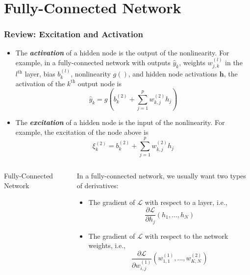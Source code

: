 \documentclass{beamer}
\begin{document}
\section[FCN]{Fully-Connected Network}
\setcounter{subsection}{1}

\begin{frame}
  \frametitle{Review: Excitation and Activation}
  \begin{itemize}
  \item The {\bf\em activation} of a hidden node is the output
    of the nonlinearity.  For example, in a fully-connected
    network with outputs $\hat{y}_k$, weights $w_{j,k}^{(l)}$ in
    the $l^{\text{th}}$ layer, bias $b_k^{(l)}$, nonlinearity
    $g()$, and hidden node activations $\bm{h}$, the activation
    of the $k^{\textrm{th}}$ output node is
    \[
    \hat{y}_k = g\left(b_{k}^{(2)}+\sum_{j=1}^p w_{k,j}^{(2)} h_j\right)
    \]
  \item The {\bf\em excitation} of a hidden node is the input of the
    nonlinearity.  For example, the excitation of the node above is
    \[
    \xi_k^{(2)}=b_{k}^{(2)}+\sum_{j=1}^p w_{k,j}^{(2)} h_j
    \]
  \end{itemize}
\end{frame}


\begin{frame}
  \begin{columns}
    \begin{column}{0.5\textwidth}
      \begin{block}{Fully-Connected Network}
        
      \end{block}
    \end{column}
    \begin{column}{0.5\textwidth}
      \begin{block}{}
        In a fully-connected network, we usually want two types of derivatives:
        \begin{itemize}
        \item The gradient of $\mathcal{L}$ with respect to a layer, i.e.,
          \begin{displaymath}
            \frac{\partial\mathcal{L}}{\partial h_j}(h_1,\ldots,h_N)
          \end{displaymath}
        \item The gradient of $\mathcal{L}$ with respect to the network weights, i.e.,
          \begin{displaymath}
            \frac{\partial\mathcal{L}}{\partial w^{(1)}_{i,j}}(w^{(1)}_{1,1},\ldots,w^{(2)}_{K,N})
          \end{displaymath}
        \end{itemize}
      \end{block}
    \end{column}
  \end{columns}
\end{frame}
\end{document}
